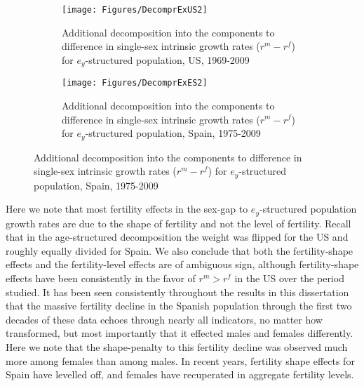 \begin{figure}
        \centering
        \begin{subfigure}
                \centering
                \caption{Additional decomposition into the components
                to difference in single-sex intrinsic growth rates
                ($r^m - r^f$) for $e_y$-structured population, US, 1969-2009}
                \texttt{[image: Figures/DecomprExUS2]}
                \label{fig:exDecomprUS2}
        \end{subfigure}
        \begin{subfigure}
                \centering
                \caption{Additional decomposition into the components to difference in single-sex intrinsic growth
                rates ($r^m - r^f$) for $e_y$-structured population, Spain,
                1975-2009}
                \texttt{[image: Figures/DecomprExES2]}
                \label{fig:exDecomprES2}
        \end{subfigure}
\end{figure}

 Here we note that most fertility effects in the sex-gap to $e_y$-structured
 population growth rates are due to the shape of fertility and not the level of
 fertility. Recall that in the age-structured decomposition the weight was
 flipped for the US and roughly equally divided for Spain. We also conclude that
 both the fertility-shape effects and the fertility-level effects are of
 ambiguous sign, although fertility-shape effects have been
 consistently in the favor of $r^m > r^f$ in the US over the period studied. It
 has been seen consistently throughout the results in this dissertation that
 the massive fertility decline in the Spanish population through the first two
 decades of these data echoes through nearly all indicators, no matter how
 transformed, but most importantly that it effected males and females differently. 
 Here we note that the shape-penalty to
 this fertility decline was observed much more among females than among males.
 In recent years, fertility shape effects for Spain have levelled off, and
 females have recuperated in aggregate fertility levels.
 
